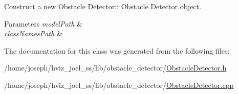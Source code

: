 Construct a new Obstacle Detector\+:\+: Obstacle Detector object. 


\begin{DoxyParams}{Parameters}
{\em model\+Path} & \\
\hline
{\em class\+Names\+Path} & \\
\hline
\end{DoxyParams}


The documentation for this class was generated from the following files\+:\begin{DoxyCompactItemize}
\item 
/home/joseph/hviz\+\_\+joel\+\_\+ss/lib/obstacle\+\_\+detector/\hyperlink{ObstacleDetector_8h}{Obstacle\+Detector.\+h}\item 
/home/joseph/hviz\+\_\+joel\+\_\+ss/lib/obstacle\+\_\+detector/\hyperlink{ObstacleDetector_8cpp}{Obstacle\+Detector.\+cpp}\end{DoxyCompactItemize}
